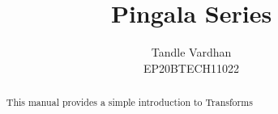 \documentclass[journal,12pt,twocolumn]{IEEEtran}
\begin{document}
	\renewcommand{\thefigure}{\arabic{section}.\arabic{figure}}
	\makeatletter
	\makeatother
	
	
	\def\putbox#1#2#3{\makebox[0in][l]{\makebox[#1][l]{}\raisebox{\baselineskip}[0in][0in]{\raisebox{#2}[0in][0in]{#3}}}}
	\def\rightbox#1{\makebox[0in][r]{#1}}
	\def\centbox#1{\makebox[0in]{#1}}
	\def\topbox#1{\raisebox{-\baselineskip}[0in][0in]{#1}}
	\def\midbox#1{\raisebox{-0.5\baselineskip}[0in][0in]{#1}}
	
	\vspace{3cm}
	
	\title{ 
		Pingala Series
	}
	
	
	
	\author{Tandle Vardhan\\EP20BTECH11022}
	
	\maketitle
	
	
	\tableofcontents
	
	\bigskip
	
	\begin{abstract}
		This manual provides a simple introduction to Transforms
	\end{abstract}
\end{document}
